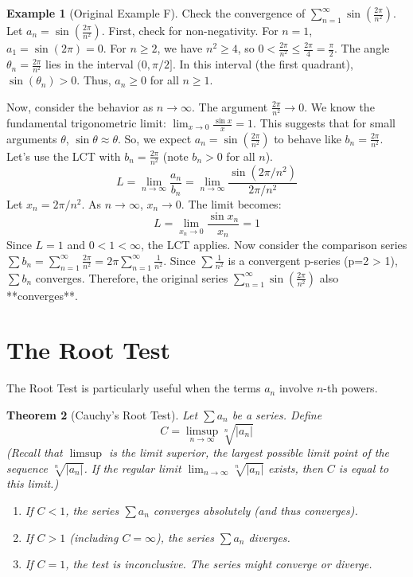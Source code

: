 \documentclass[11pt]{article}
\theoremstyle{plain}
\newtheorem{theorem}{Theorem}[section]
\theoremstyle{definition}
\newtheorem{example}[theorem]{Example}
\theoremstyle{remark}
\theoremstyle{adminstyle}
\begin{document}
\begin{example}[Original Example F] \label{ex:sin_2pi_over_n2}
Check the convergence of $\sum_{n=1}^{\infty} \sin\left(\frac{2\pi}{n^2}\right)$.
Let $a_n = \sin\left(\frac{2\pi}{n^2}\right)$.
First, check for non-negativity.
For $n=1$, $a_1 = \sin(2\pi) = 0$.
For $n \ge 2$, we have $n^2 \ge 4$, so $0 < \frac{2\pi}{n^2} \le \frac{2\pi}{4} = \frac{\pi}{2}$.
The angle $\theta_n = \frac{2\pi}{n^2}$ lies in the interval $(0, \pi/2]$. In this interval (the first quadrant), $\sin(\theta_n) > 0$.
Thus, $a_n \ge 0$ for all $n \ge 1$.

Now, consider the behavior as $n \to \infty$. The argument $\frac{2\pi}{n^2} \to 0$.
We know the fundamental trigonometric limit: $\lim_{x\to 0} \frac{\sin x}{x} = 1$.
This suggests that for small arguments $\theta$, $\sin \theta \approx \theta$.
So, we expect $a_n = \sin\left(\frac{2\pi}{n^2}\right)$ to behave like $b_n = \frac{2\pi}{n^2}$.
Let's use the LCT with $b_n = \frac{2\pi}{n^2}$ (note $b_n > 0$ for all $n$).
\[ L = \lim_{n\to\infty} \frac{a_n}{b_n} = \lim_{n\to\infty} \frac{\sin(2\pi/n^2)}{2\pi/n^2} \]
Let $x_n = 2\pi/n^2$. As $n \to \infty$, $x_n \to 0$. The limit becomes:
\[ L = \lim_{x_n\to 0} \frac{\sin x_n}{x_n} = 1 \]
Since $L=1$ and $0 < 1 < \infty$, the LCT applies.
Now consider the comparison series $\sum b_n = \sum_{n=1}^{\infty} \frac{2\pi}{n^2} = 2\pi \sum_{n=1}^{\infty} \frac{1}{n^2}$.
Since $\sum \frac{1}{n^2}$ is a convergent p-series (p=2 > 1), $\sum b_n$ converges.
Therefore, the original series $\sum_{n=1}^{\infty} \sin\left(\frac{2\pi}{n^2}\right)$ also **converges**.
\end{example}

\section{The Root Test}

The Root Test is particularly useful when the terms $a_n$ involve $n$-th powers.

\begin{theorem}[Cauchy's Root Test]
Let $\sum a_n$ be a series. Define
\[ C = \limsup_{n\to\infty} \sqrt[n]{|a_n|} \]
(Recall that $\limsup$ is the limit superior, the largest possible limit point of the sequence $\sqrt[n]{|a_n|}$. If the regular limit $\lim_{n\to\infty} \sqrt[n]{|a_n|}$ exists, then $C$ is equal to this limit.)
\begin{enumerate}
    \item If $C < 1$, the series $\sum a_n$ converges absolutely (and thus converges).
    \item If $C > 1$ (including $C = \infty$), the series $\sum a_n$ diverges.
    \item If $C = 1$, the test is inconclusive. The series might converge or diverge.
\end{enumerate}
\end{theorem}
\end{document}
